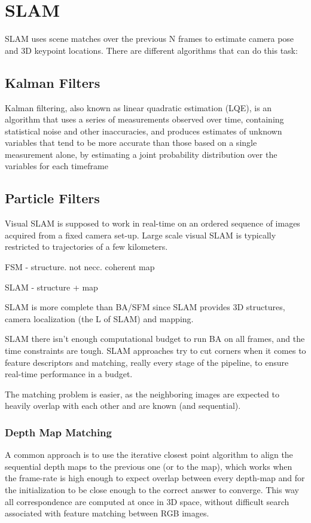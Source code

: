 \section{SLAM}

SLAM uses scene matches over the previous N frames to estimate camera pose and 3D keypoint locations. There are different algorithms that can do this task:

\subsection{Kalman Filters}
Kalman filtering, also known as linear quadratic estimation (LQE), is an algorithm that uses a series of measurements observed over time, containing statistical noise and other inaccuracies, and produces estimates of unknown variables that tend to be more accurate than those based on a single measurement alone, by estimating a joint probability distribution over the variables for each timeframe

\subsection{Particle Filters}

Visual SLAM is supposed to work in real-time on an ordered sequence of images acquired from a fixed camera set-up. Large scale visual SLAM is typically restricted to trajectories of a few kilometers.

FSM - structure. not necc. coherent map

SLAM - structure + map

SLAM is more complete than BA/SFM since SLAM provides 3D structures, camera localization (the L of SLAM) and mapping.

SLAM there isn’t enough computational budget to run BA on all frames, and the time constraints are tough. SLAM approaches try to cut corners when it comes to feature descriptors and matching, really every stage of the pipeline, to ensure real-time performance in a budget. 

The matching problem is easier, as the  neighboring images are expected to heavily overlap with each other and are known (and sequential).

\subsubsection{Depth Map Matching}

A common approach is to use the iterative closest point algorithm to align the sequential depth maps to the previous one (or to the map), which works when the frame-rate is high enough to expect overlap between every depth-map and for the initialization to be close enough to the correct answer to converge. This way all correspondence are computed at once in 3D space, without difficult search associated with feature matching between RGB images.

